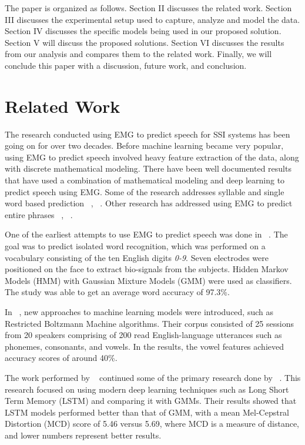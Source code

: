 \documentclass[conference]{IEEEtran}
\begin{document}
The paper is organized as follows. Section II discusses the related work. Section III discusses the experimental setup used to capture, analyze and model the data. Section IV discusses the specific models being used in our proposed solution. Section V will discuss the proposed solutions. Section VI discusses the results from our analysis and compares them to the related work. Finally, we will conclude this paper with a discussion, future work, and conclusion.

\section{Related Work}
The research conducted using EMG to predict speech for SSI systems has been going on for over two decades. Before machine learning became very popular, using EMG to predict speech involved heavy feature extraction of the data, along with discrete mathematical modeling. There have been well documented results that have used a combination of mathematical modeling and deep learning to predict speech using EMG. Some of the research addresses syllable and single word based prediction ~\cite{lopez-larraz_syllable-based_2010}, ~\cite{maier-hein_session_2005}. Other research has addressed using EMG to predict entire phrases ~\cite{janke_emg--speech:_2017}, ~\cite{kapur_alterego:_2018}.

One of the earliest attempts to use EMG to predict speech was done in ~\cite{maier-hein_session_2005}. The goal was to predict isolated word recognition,
which was performed on a vocabulary consisting of the ten English digits \textit{0-9}. Seven electrodes were positioned on the face to extract bio-signals from the subjects. Hidden Markov Models (HMM) with Gaussian Mixture Models (GMM) were used as classifiers. The study was able to get an average word accuracy of 97.3\%. 

In ~\cite{wand_pattern_2014}, new approaches to  machine learning models were introduced, such as
Restricted Boltzmann Machine algorithms. Their corpus consisted of 25 sessions from
20 speakers comprising of 200 read English-language utterances such as phonemes,
consonants, and vowels. In the results, the vowel features achieved accuracy scores of around 40\%. 

The work performed by ~\cite{janke_emg--speech:_2017} continued some of the primary
research done by ~\cite{wand_pattern_2014}. This research focused on using modern
deep learning techniques such as Long Short Term Memory (LSTM) and comparing it with
GMMs. Their results showed that LSTM models performed better than that of GMM, with a
mean Mel-Cepstral Distortion (MCD) score of 5.46 versus 5.69, where MCD is a measure of distance, and lower numbers represent better results. 
\end{document}
